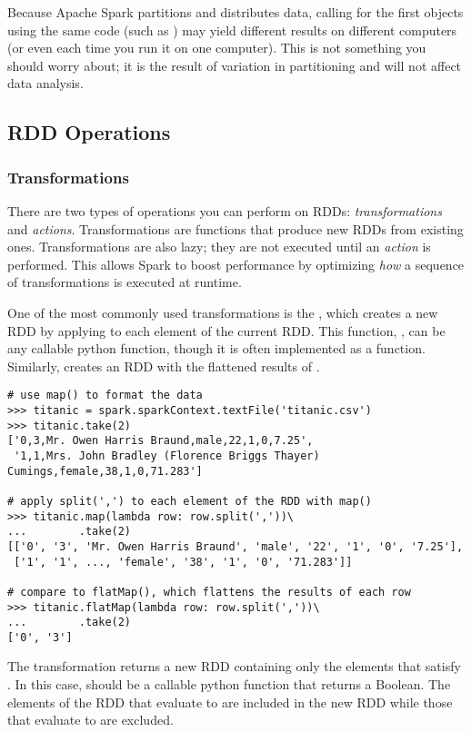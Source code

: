 \begin{warn}
Because Apache Spark partitions and distributes data, calling for the first  objects using the same code (such as ) may yield different results on different computers (or even each time you run it on one computer). 
This is not something you should worry about; it is the result of variation in partitioning and will not affect data analysis.
\end{warn}

\subsection*{RDD Operations}
\subsubsection*{Transformations}
There are two types of operations you can perform on RDDs: \textit{transformations} and \textit{actions}.
Transformations are functions that produce new RDDs from existing ones.
Transformations are also lazy; they are not executed until an \textit{action} is performed.
This allows Spark to boost performance by optimizing \textit{how} a sequence of transformations is executed at runtime.

One of the most commonly used transformations is the , which creates a new RDD by applying  to each element of the current RDD. This function, , can be any callable python function, though it is often implemented as a  function.
Similarly,  creates an RDD with the flattened results of .

\begin{lstlisting}
# use map() to format the data
>>> titanic = spark.sparkContext.textFile('titanic.csv')
>>> titanic.take(2)
['0,3,Mr. Owen Harris Braund,male,22,1,0,7.25',
 '1,1,Mrs. John Bradley (Florence Briggs Thayer) Cumings,female,38,1,0,71.283']

# apply split(',') to each element of the RDD with map()
>>> titanic.map(lambda row: row.split(','))\
...		   .take(2)
[['0', '3', 'Mr. Owen Harris Braund', 'male', '22', '1', '0', '7.25'],
 ['1', '1', ..., 'female', '38', '1', '0', '71.283']]

# compare to flatMap(), which flattens the results of each row
>>> titanic.flatMap(lambda row: row.split(','))\
...		   .take(2)
['0', '3']
\end{lstlisting}

The  transformation returns a new RDD containing only the elements that satisfy . In this case,  should be a callable python function that returns a Boolean. 
The elements of the RDD that evaluate to  are included in the new RDD while those that evaluate to  are excluded.


